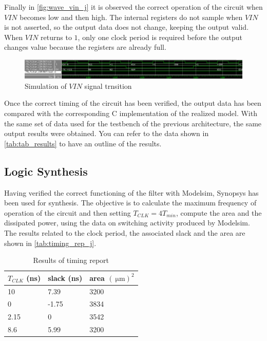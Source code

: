 Finally in \autoref{fig:wave_vin_j} it is observed the correct operation of the circuit when $VIN$ becomes low and then high. The internal registers do not sample when $VIN$ is not asserted, so the output data does not change, keeping the output valid. When $VIN$ returns to $1$, only one clock period is required before the output changes value because the registers are already full.

\begin{figure}[h]
	\center
	\includegraphics[width=1\textwidth]{images/wave_vin_0_1_j_look_ahead.png}
	\caption{Simulation of $VIN$ signal trnsition}
	\label{fig:wave_vin_j}
\end{figure}

Once the correct timing of the circuit has been verified, the output data has been compared with the corresponding C implementation of the realized model. With the same set of data used for the testbench of the previous architecture, the same output results were obtained. You can refer to the data shown in \autoref{tab:tab_results} to have an outline of the results.


\subsection{Logic Synthesis}
Having verified the correct functioning of the filter with Modelsim, Synopsys has been used for synthesis. The objective is to calculate the maximum frequency of operation of the circuit and then setting $T_{CLK} = 4 T_{min}$, compute the area and the dissipated power, using the data on switching activity produced by Modelsim.
The results related to the clock period, the associated slack and the area are shown in \autoref{tab:timing_rep_j}.

\begin{table}[h]
\begin{center}
\begin{tabular}{|l|l|l|}
\hline
$T_{CLK}$ (ns) & slack (ns) & area $(\SI{}{\micro\meter})^2$ \\
\hline
10 & 7.39 &  3200\\
0 & -1.75 &  3834\\
2.15 & 0 & 3542 \\
8.6 & 5.99 & 3200 \\
\hline
\end{tabular}
\end{center}
\caption{Results of timing report}
\label{tab:timing_rep_j}
\end{table}

